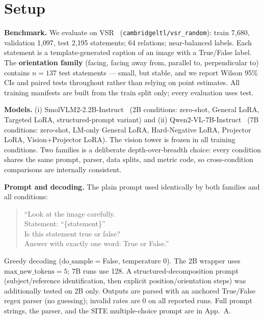 \section{Setup}
\label{sec:setup}

\textbf{Benchmark.} We evaluate on VSR~\cite{liu2023vsr}
(\texttt{cambridgeltl/vsr\_random}): train 7{,}680, validation 1{,}097, test
2{,}195 statements; 64 relations; near-balanced labels. Each statement is a
template-generated caption of an image with a True/False label. The
\textbf{orientation family} (facing, facing away from, parallel to, perpendicular
to) contains $n{=}137$ test statements --- small, but stable, and we report Wilson
95\% CIs and paired tests throughout rather than relying on point estimates. All
training manifests are built from the train split only; every evaluation uses
test.

\textbf{Models.} (i) SmolVLM2-2.2B-Instruct~\cite{huggingface2025smolvlm2} (2B
conditions: zero-shot, General LoRA, Targeted LoRA, structured-prompt variant) and
(ii) Qwen2-VL-7B-Instruct~\cite{wang2024qwen2vl} (7B conditions: zero-shot, LM-only
General LoRA, Hard-Negative LoRA, Projector LoRA, Vision+Projector LoRA). The
vision tower is frozen in all training conditions. Two families is a deliberate
depth-over-breadth choice: every condition shares the same prompt, parser, data
splits, and metric code, so cross-condition comparisons are internally consistent.

\textbf{Prompt and decoding.} The plain prompt used identically by both families
and all conditions:
\begin{quote}
\small
``Look at the image carefully.\\
Statement: ``\{statement\}''\\
Is this statement true or false?\\
Answer with exactly one word: True or False.''
\end{quote}
Greedy decoding ($\mathrm{do\_sample}{=}$False, temperature 0). The 2B wrapper
uses $\mathrm{max\_new\_tokens}{=}5$; 7B runs use 128. A structured-decomposition
prompt (subject/reference identification, then explicit position/orientation
steps) was additionally tested on 2B only. Outputs are parsed with an anchored
True/False regex parser (no guessing); invalid rates are 0 on all reported runs.
Full prompt strings, the parser, and the SITE multiple-choice prompt are in
App.~A.

